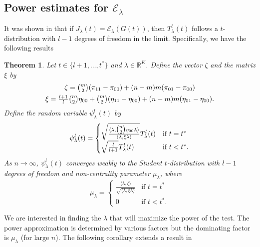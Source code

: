 \documentclass[10pt,journal,compsoc]{IEEEtran}
\newtheorem{theorem}{Theorem}
\theoremstyle{definition}
\begin{document}
\subsection{Power estimates for $\mathcal{E}_\lambda$}
\label{sec:power-estim-mathc}
It was shown in \cite{lee11} that if $J_\lambda(t) =
\mathcal{E}_{\lambda}(G(t))$, then $T_{\lambda}^{l}(t)$ follows a
$t$-distribution with $l - 1$ degrees of freedom in the
limit. Specifically, we have the following results
\begin{theorem}
  \label{thm:9}
  Let $t \in \{l+1, \dots, t^{*}\}$ and $\lambda \in
  \mathbb{R}^{K}$. Define the vector $\zeta$ and the matrix $\xi$ by
  \begin{gather*}
    \zeta = \tbinom{m}{2}(\pi_{11} - \pi_{00}) + (n-m)m(\pi_{01} -
    \pi_{00}) \\
    \xi = \tfrac{l+1}{l}\tbinom{n}{2} \eta_{00} +
          \tbinom{m}{2}(\eta_{11} - \eta_{00}) + (n-m)m(\eta_{01} -
          \eta_{00}).
  \end{gather*}
  Define the random variable $\psi^{l}_{\lambda}(t)$ by
  \begin{equation}
    \label{eq:10}
    \psi^{l}_{\lambda}(t) = \begin{cases}
      \sqrt{\frac{\langle \lambda, \tbinom{n}{2} \eta_{00}
            \lambda \rangle}{\langle \lambda, \xi
            \lambda \rangle}} T_{\lambda}^{l}(t) & \text{if $t = t^{*}$} \\
      \sqrt{\frac{l}{l + 1}} T_{\lambda}^{l}(t)& \text{if $t <
        t^{*}$}.
      \end{cases}
  \end{equation}
As $n \rightarrow \infty$,
  $\psi^{l}_{\lambda}(t)$ converges weakly to the Student
  $t$-distribution with $l-1$ degrees of freedom and non-centrality
  parameter $\mu_{\lambda}$, where
  \begin{equation}
    \label{eq:15}
    \mu_{\lambda} = \begin{cases}
      \frac{\langle \lambda, \zeta \rangle}{\sqrt{\langle \lambda, \xi \lambda \rangle}} & \text{if $t = t^{*}$} \\
      0 & \text{if $t < t^{*}$}.
    \end{cases}
  \end{equation}
\end{theorem}
We are interested in finding the $\lambda$ that will maximize the
power of the test. The power approximation is determined by various
factors but the dominating factor is $\mu_{\lambda}$ (for large $n$). 
The following corollary extends a result in
\end{document}
